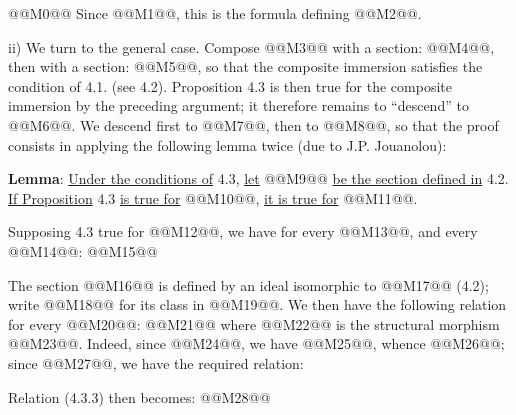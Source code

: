 @@M0@@
Since @@M1@@, this is the formula defining @@M2@@.

ii) We turn to the general case. Compose @@M3@@ with a section: @@M4@@, then with a section: @@M5@@, so that the composite immersion satisfies the condition of 4.1. (see 4.2). Proposition 4.3 is then true for the composite immersion by the preceding argument; it therefore remains to ``descend'' to @@M6@@. We descend first to @@M7@@, then to @@M8@@, so that the proof consists in applying the following lemma twice (due to J.P. Jouanolou):

\textbf{Lemma}: \uline{Under the conditions of} 4.3, \uline{let} @@M9@@ \uline{be the section defined in} 4.2. \uline{If Proposition} 4.3 \uline{is true for} @@M10@@, \uline{it is true for} @@M11@@.

Supposing 4.3 true for @@M12@@, we have for every @@M13@@, and every @@M14@@:
@@M15@@

The section @@M16@@ is defined by an ideal isomorphic to @@M17@@ (4.2); write @@M18@@ for its class in @@M19@@. We then have the following relation for every @@M20@@:
@@M21@@
where @@M22@@ is the structural morphism @@M23@@. Indeed, since @@M24@@, we have @@M25@@, whence @@M26@@; since @@M27@@, we have the required relation:

Relation (4.3.3) then becomes:
@@M28@@
